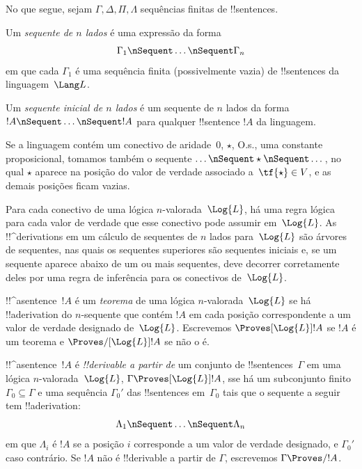 \documentclass[../../../include/open-logic-section]{subfiles}
\begin{document}


No que segue, sejam $\Gamma, \Delta, \Pi, \Lambda$ sequências finitas
de !!{sentence}s.

\begin{defn}[Sequente]
Um \emph{sequente de $n$ lados} é uma expressão da forma
\[
\Gamma_1 \nSequent \dots \nSequent \Gamma_n
\]
em que cada $\Gamma_1$ é uma sequência finita (possivelmente vazia) de
!!{sentence}s da linguagem~$\Lang L$.
\end{defn}

\begin{defn}
Um \emph{sequente inicial de $n$ lados} é um sequente de $n$ lados da
forma $!A \nSequent \dots \nSequent !A$ para qualquer !!{sentence} $!A$
da linguagem.

Se a linguagem contém um conectivo de aridade~$0$, $\star$, O.s.\@, uma
constante proposicional, tomamos também o sequente $\dots \nSequent
\star \nSequent \dots$, no qual $\star$ aparece na posição do valor de
verdade associado a~$\tf{\star} \in V$, e as demais posições ficam vazias.
\end{defn}

Para cada conectivo de uma lógica $n$-valorada~$\Log{L}$, há uma regra
lógica para cada valor de verdade que esse conectivo pode assumir
em~$\Log{L}$. As !!^{derivation}s em um cálculo de sequentes de $n$
lados para~$\Log{L}$ são árvores de sequentes, nas quais os sequentes
superiores são sequentes iniciais e, se um sequente aparece abaixo de
um ou mais sequentes, deve decorrer corretamente deles por uma regra
de inferência para os conectivos de~$\Log{L}$.

\begin{defn}[Teoremas]
!!^a{sentence}~$!A$ é um \emph{teorema} de uma lógica
$n$-valorada~$\Log{L}$ se há !!a{derivation} do $n$-sequente que contém
$!A$ em cada posição correspondente a um valor de verdade designado
de~$\Log{L}$. Escrevemos $\Proves[\Log{L}] !A$ se $!A$ é um teorema e
$\Proves/[\Log{L}] !A$ se não o é.
\end{defn}

\begin{defn}[!!^{derivability}]
!!^a{sentence}~$!A$ é \emph{!!{derivable} a partir de} um conjunto de
!!{sentence}s~$\Gamma$ em uma lógica $n$-valorada~$\Log{L}$, $\Gamma
\Proves[\Log{L}] !A$, sse há um subconjunto finito~$\Gamma_0 \subseteq
\Gamma$ e uma sequência $\Gamma_0'$ das !!{sentence}s em~$\Gamma_0$
tais que o sequente a seguir tem !!a{derivation}:
\[ \Lambda_1 \nSequent \dots \nSequent \Lambda_n \] em que $\Lambda_i$
é $!A$ se a posição $i$ corresponde a um valor de verdade designado, e
$\Gamma_0'$ caso contrário. Se $!A$ não é !!{derivable} a partir de
$\Gamma$, escrevemos $\Gamma \Proves/ !A$.
\end{defn}
\end{document}
